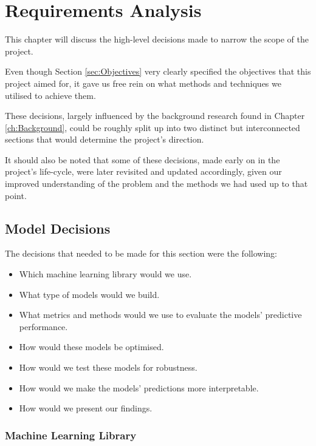 \chapter{Requirements Analysis}
\label{ch:Requirements_Analysis}

This chapter will discuss the high-level decisions made to narrow the scope of the project. 

Even though Section \ref{sec:Objectives} very clearly specified the objectives that this project aimed for, it gave us free rein on what methods and techniques we utilised to achieve them. 

These decisions, largely influenced by the background research found in Chapter \ref{ch:Background}, could be roughly split up into two distinct but interconnected sections that would determine the project's direction.

It should also be noted that some of these decisions, made early on in the project's life-cycle, were later revisited and updated accordingly, given our improved understanding of the problem and the methods we had used up to that point.

\section{Model Decisions}

The decisions that needed to be made for this section were the following:

\begin{itemize}
    \item
    Which machine learning library would we use.
    \item
    What type of models would we build.
    \item
    What metrics and methods would we use to evaluate the models' predictive performance.
    \item
    How would these models be optimised.
    \item
    How would we test these models for robustness.
    \item
    How would we make the models' predictions more interpretable.
    \item
    How would we present our findings.
\end{itemize}

\subsection{Machine Learning Library}

